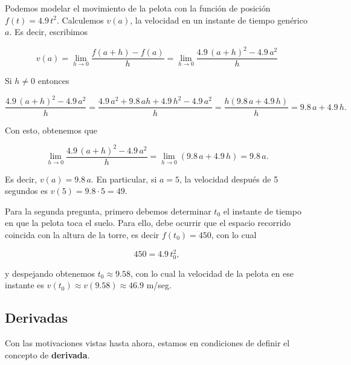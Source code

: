 \documentclass[
  letterpaper,
]{book}
\theoremstyle{plain}
\theoremstyle{remark}
\begin{document}
\begin{tcolorbox}[enhanced jigsaw, opacityback=0, left=2mm, opacitybacktitle=0.6, toprule=.15mm, bottomrule=.15mm, colbacktitle=quarto-callout-tip-color!10!white, titlerule=0mm, bottomtitle=1mm, title=\textcolor{quarto-callout-tip-color}{\faLightbulb}\hspace{0.5em}{Solución}, toptitle=1mm, colframe=quarto-callout-tip-color-frame, colback=white, breakable, rightrule=.15mm, arc=.35mm, leftrule=.75mm, coltitle=black]

Podemos modelar el movimiento de la pelota con la función de posición
\(f(t)=4.9\,t^2\). Calculemos \(v(a)\), la velocidad en un instante de
tiempo genérico \(a\). Es decir, escribimos

\[
v(a)=\lim_{h\to 0} \frac{f(a+h)-f(a)}{h}=\lim_{h\to 0} \frac{4.9\,(a+h)^2-4.9\,a^2}{h}
\]

Si \(h\neq 0\) entonces

\[
\frac{4.9\,(a+h)^2-4.9\,a^2}{h}=\frac{4.9\, a^2+9.8\,ah+4.9\,h^2-4.9\,a^2}{h}=\frac{h(9.8\,a+4.9\,h)}{h}=9.8\,a+4.9\,h.
\]

Con esto, obtenemos que

\[
\lim_{h\to 0} \frac{4.9\,(a+h)^2-4.9\,a^2}{h}=\lim_{h\to 0} (9.8\,a+4.9\,h)=9.8\,a.
\]

Es decir, \(v(a)=9.8\, a\). En particular, si \(a=5\), la velocidad
después de 5 segundos es \(v(5)=9.8\cdot 5 =49\).

Para la segunda pregunta, primero debemos determinar \(t_0\) el instante
de tiempo en que la pelota toca el suelo. Para ello, debe ocurrir que el
espacio recorrido coincida con la altura de la torre, es decir
\(f(t_0)=450\), con lo cual

\[
450=4.9\, t_0^2,
\]

y despejando obtenemos \(t_0\approx 9.58\), con lo cual la velocidad de
la pelota en ese instante es \(v(t_0)\approx v(9.58)\approx 46.9\)
m/seg.

\end{tcolorbox}

\subsection{Derivadas}\label{derivadas}

Con las motivaciones vistas hasta ahora, estamos en condiciones de
definir el concepto de \textbf{derivada}.
\end{document}
